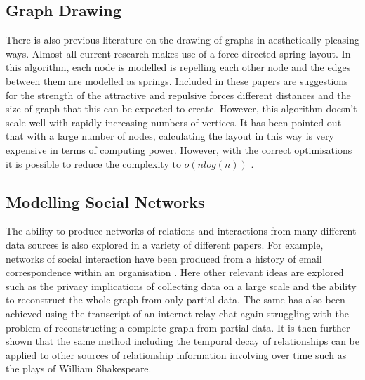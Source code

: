 \documentclass[12pt,a4paper]{article}
\begin{document}
\subsection{Graph Drawing}
There is also previous literature on the drawing of graphs in aesthetically pleasing ways. Almost all current research makes use of a force directed spring layout. In this algorithm, each node is modelled is repelling each other node and the edges between them are modelled as springs\cite{fruchterman1991graph}. Included in these papers are suggestions for the strength of the attractive and repulsive forces different distances and the size of graph that this can be expected to create. However, this algorithm doesn't scale well with rapidly increasing numbers of vertices. It has been pointed out that with a large number of nodes, calculating the layout in this way is very expensive in terms of computing power. However, with the correct optimisations it is possible to reduce the complexity to $o(nlog(n))$ \cite{barnes1986hierarchical}.

\subsection{Modelling Social Networks}
The ability to produce networks of relations and interactions from many different data sources is also explored in a variety of different papers. For example, networks of social interaction have been produced from a history of email correspondence within an organisation \cite{fisher2004social}. Here other relevant ideas are explored such as the privacy implications of collecting data on a large scale and the ability to reconstruct the whole graph from only partial data. The same has also been achieved using the transcript of an internet relay chat \cite{mutton2004inferring} again struggling with the problem of reconstructing a complete graph from partial data. It is then further shown that the same method including the temporal decay of relationships can be applied to other sources of relationship information involving over time such as the plays of William Shakespeare.
\end{document}
